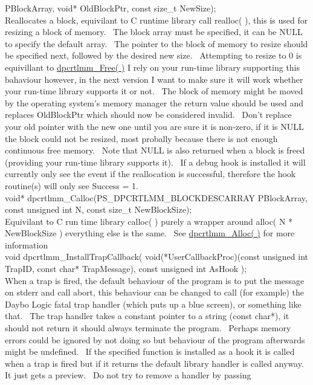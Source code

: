 \documentclass{article}
\begin{document}
PBlockArray, void* OldBlockPtr, const size\_t NewSize);
\\
Reallocates a block, equivilant to C runtime library call realloc(
), this is used for resizing a block of memory.~ The block array
must
be specified, it can be NULL to specify the default array.~ The
pointer
to the block of memory to resize should be specified next, followed by
the desired new size.~ Attempting to resize to 0 is equivillant to
\href{#Free}{dpcrtlmm\_Free(
)} I rely on your run-time library supporting this bahaviour
however,
in the next version I want to make sure it will work whether your
run-time
library supports it or not.~ The block of memory might be moved by
the operating system's memory manager the return value should be used
and
replaces OldBlockPtr which should now be considered invalid.~
Don't
replace your old pointer with the new one until you are sure it is
non-zero,
if it is NULL the block could not be resized, most probally because
there
is not enough continuous free memory.~ Note that NULL is also
returned
when a block is freed (providing your run-time library supports
it).~
If a debug hook is installed it will currently only see the event if
the
reallocation is successful, therefore the hook routine(s) will only see
Success = 1.
\\
void* dpcrtlmm\_Calloc(PS\_DPCRTLMM\_BLOCKDESCARRAY
PBlockArray, const unsigned int N, const size\_t NewBlockSize);
\\
Equivilant to C run time library calloc( ) purely a wrapper around
alloc( N * NewBlockSize ) everything else is the same.~ See \href{#Alloc}{dpcrtlmm\_Alloc(
)} for more information
\\
void dpcrtlmm\_InstallTrapCallback(
void(*UserCallbackProc)(const
unsigned int TrapID, const char* TrapMessage), const unsigned int
AsHook
);
\\
When a trap is fired, the default behaviour of the program is to put
the message on stderr and call abort, this behaviour can be changed to
call (for example) the Daybo Logic fatal trap handler (which puts up a
blue screen), or something like that.~ The trap handler takes a
constant
pointer to a string (const char*), it should not return it should
always
terminate the program.~ Perhaps memory errors could be ignored by
not doing so but behaviour of the program afterwards might be
undefined.~
If the specified function is installed as a hook it is called when a
trap
is fired but if it returns the default library handler is called
anyway.~
It just gets a preview.~ Do not try to remove a handler by passing
\end{document}
